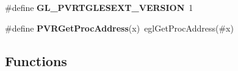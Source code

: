 \begin{DoxyCompactItemize}
\item 
\hypertarget{group___a_p_i___o_g_l_e_s_ga2eb4395839440f4db904a0cd3c6061f4}{\#define {\bfseries G\+L\+\_\+\+P\+V\+R\+T\+G\+L\+E\+S\+E\+X\+T\+\_\+\+V\+E\+R\+S\+I\+O\+N}~1}\label{group___a_p_i___o_g_l_e_s_ga2eb4395839440f4db904a0cd3c6061f4}

\item 
\hypertarget{group___a_p_i___o_g_l_e_s_ga4d75a8396541a8b002cc3b1b4f292604}{\#define {\bfseries P\+V\+R\+Get\+Proc\+Address}(x)~egl\+Get\+Proc\+Address(\#x)}\label{group___a_p_i___o_g_l_e_s_ga4d75a8396541a8b002cc3b1b4f292604}

\end{DoxyCompactItemize}
\subsection*{Functions}

